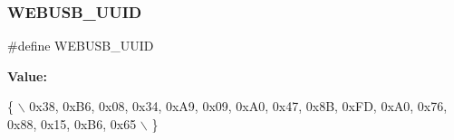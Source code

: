 \subsubsection{\texorpdfstring{W\+E\+B\+U\+S\+B\+\_\+\+U\+U\+ID}{WEBUSB\_UUID}}
{\footnotesize\ttfamily \#define W\+E\+B\+U\+S\+B\+\_\+\+U\+U\+ID}

{\bfseries Value\+:}
\begin{DoxyCode}
\{                                                                                                \(\backslash\)
    0x38, 0xB6, 0x08, 0x34, 0xA9, 0x09, 0xA0, 0x47, 0x8B, 0xFD, 0xA0, 0x76, 0x88, 0x15, 0xB6, 0x65 \(\backslash\)
  \}
\end{DoxyCode}
